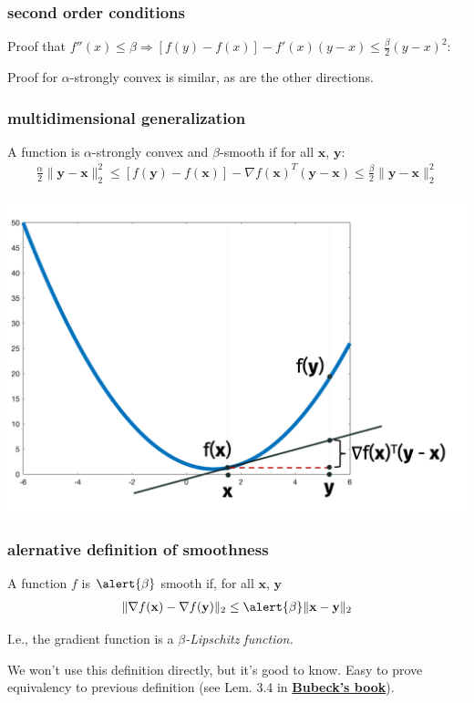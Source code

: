\documentclass[compress]{beamer}
\newcommand{\bv}[1]{\mathbf{#1}}
\begin{document}
 \begin{frame}[t]
	\frametitle{second order conditions}
	Proof that $f''(x)\leq \beta \Rightarrow [f(y) - f(x)] - f'(x)(y-x) \leq \frac{\beta}{2}(y-x)^2$:

	\vspace{15em} Proof for $\alpha$-strongly convex is similar, as are the other directions. 
 \end{frame}

 \begin{frame}[t]
	\frametitle{multidimensional generalization}
	A function is \alert{ $\alpha$-strongly convex} and \alert{$\beta$-smooth} if for all $\bv{x}$, $\bv{y}$:
	\begin{align*}
		\frac{\alpha}{2}\|\bv{y} - \bv{x}\|_2^2 \leq \left[f(\bv{y}) - f(\bv{x})\right] - \nabla f(\bv{x})^T(\bv{y} - \bv{x}) \leq \frac{\beta}{2}\|\bv{y}-\bv{x}\|_2^2
	\end{align*}
\vspace{-2em}
\begin{center}
	\includegraphics[width=.75\textwidth]{smoothness_image.png}
\end{center}	
\end{frame}


\begin{frame}[t]
	\frametitle{alernative definition of smoothness}
	\begin{definition}
		A function $f$ is $\alert{\beta}$ smooth if, for all $\bv{x}$, $\bv{y}$
		\begin{align*}
			\|\nabla f(\bv{x}) - \nabla f(\bv{y})\|_2 \leq \alert{\beta} \|\bv{x} - \bv{y}\|_2
		\end{align*}
	\end{definition}
	I.e., the gradient function is a \emph{$\beta$-Lipschitz function.} 
	
	We won't use this definition directly, but it's good to know. Easy to prove equivalency to previous definition (see Lem. 3.4 in \color{blue}\textbf{\href{https://arxiv.org/pdf/1405.4980.pdf}{Bubeck's book}}\color{black}).
 \end{frame}
\end{document}
